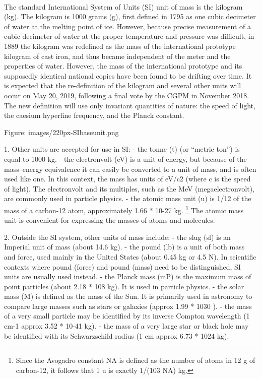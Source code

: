 \documentclass{book}
\begin{document}
\paragraph{}
The standard International System of Units (SI) unit of mass is the kilogram (kg). The kilogram is 1000 grams (g), first defined in 1795 as one cubic decimeter of water at the melting point of ice. However, because precise measurement of a cubic decimeter of water at the proper temperature and pressure was difficult, in 1889 the kilogram was redefined as the mass of the international prototype kilogram of cast iron, and thus became independent of the meter and the properties of water. However, the mass of the international prototype and its supposedly identical national copies have been found to be drifting over time. It is expected that the re-definition of the kilogram and several other units will occur on May 20, 2019, following a final vote by the CGPM in November 2018. The new definition will use only invariant quantities of nature: the speed of light, the caesium hyperfine frequency, and the Planck constant.

Figure: images/220px-SIbaseunit.png

1. Other units are accepted for use in SI:
- the tonne (t) (or ``metric ton'') is equal to 1000 kg.
- the electronvolt (eV) is a unit of energy, but because of the mass–energy equivalence it can easily be converted to a unit of mass, and is often used like one. In this context, the mass has units of eV/c2 (where c is the speed of light). The electronvolt and its multiples, such as the MeV (megaelectronvolt), are commonly used in particle physics.
- the atomic mass unit (u) is 1/12 of the mass of a carbon-12 atom, approximately 1.66 * 10{-27} kg. \footnote{Since the Avogadro constant NA is defined as the number of atoms in 12 g of carbon-12, it follows that 1 u is exactly 1/(103 NA) kg.} The atomic mass unit is convenient for expressing the masses of atoms and molecules.        

2. Outside the SI system, other units of mass include:
- the slug (sl) is an Imperial unit of mass (about 14.6 kg).
- the pound (lb) is a unit of both mass and force, used mainly in the United States (about 0.45 kg or 4.5 N). In scientific contexts where pound (force) and pound (mass) need to be distinguished, SI units are usually used instead.
- the Planck mass (mP) is the maximum mass of point particles (about 2.18 * 10{8} kg). It is used in particle physics.
- the solar mass (M) is defined as the mass of the Sun. It is primarily used in astronomy to compare large masses such as stars or galaxies (approx 1.99 * 10{30} ).
- the mass of a very small particle may be identified by its inverse Compton wavelength (1 cm{-1} approx 3.52 * 10{-41} kg).
- the mass of a very large star or black hole may be identified with its Schwarzschild radius (1 cm approx 6.73 * 10{24} kg).
\end{document}

